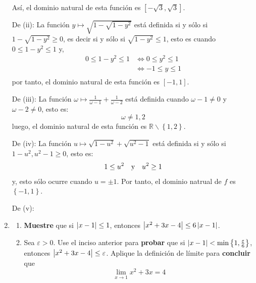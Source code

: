 \documentclass[12pt]{article}
\begin{document}
\begin{enumerate}
\begin{sol}
        Así, el dominio natural de esta función es $[-\sqrt{3},\sqrt{3}]$.

        De (ii): La función $y\mapsto\sqrt{1-\sqrt{1-y^2}}$ está definida si y sólo si $1-\sqrt{1-y^2}\geq0$, es decir si y sólo si $\sqrt{1-y^2}\leq1$, esto es cuando $0\leq1-y^2\leq 1$ y,
        \begin{equation*}
            \begin{split}
                0\leq1-y^2\leq 1&\iff 0\leq y^2\leq1\\
                &\iff -1\leq y\leq1\\
            \end{split}
        \end{equation*}
        por tanto, el dominio natural de esta función es $[-1,1]$.

        De (iii): La función $\omega\mapsto\frac{1}{\omega-1}+\frac{1}{\omega-2}$ está definida cuando $\omega-1\neq 0$ y $\omega-2\neq0$, esto es:
        \begin{equation*}
            \omega\neq1,2
        \end{equation*}
        luego, el dominio natural de esta función es $\mathbb{R}\backslash\left\{1,2 \right\}$.

        De (iv): La función $u\mapsto\sqrt{1-u^2}+\sqrt{u^2-1}$ está definida si y sólo si $1-u^2,u^2-1\geq0$, esto es:
        \begin{equation*}
            1\leq u^2\quad\textup{y}\quad u^2\geq1
        \end{equation*}
        y, esto sólo ocurre cuando $u=\pm1$. Por tanto, el dominio natrual de $f$ es $\left\{-1,1 \right\}$.

        De (v): 
    \end{sol}

    \item \begin{enumerate}
        \item \textbf{Muestre} que si $\left| x-1 \right|\leq 1$, entonces $\left| x^2+3x-4 \right|\leq 6\left| x-1 \right|$.
        \item Sea $\varepsilon>0$. Use el inciso anterior para \textbf{probar} que si $\left| x-1 \right|<\min\left\{1,\frac{\varepsilon}{6} \right\}$, entonces $\left| x^2+3x-4 \right|\leq\varepsilon$. Aplique la definición de límite para \textbf{concluir} que
        \begin{equation*}
            \lim_{x\rightarrow1}x^2+3x=4
        \end{equation*}
    \end{enumerate}


\end{enumerate}
\end{document}

